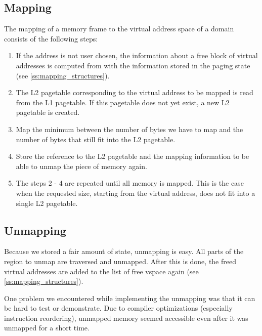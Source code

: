 \subsection{Mapping}

The mapping of a memory frame to the virtual address space of a domain 
consists of the following steps:

\begin{enumerate}
	\item If the address is not user chosen, the information about a free 
    block of virtual addresses is computed from with the information stored in 
    the paging state (see \autoref{ss:mapping_structures}).

	\item The L2 pagetable corresponding to the virtual address to be mapped 
    is read from the L1 pagetable. If this pagetable does not yet exist, a new 
    L2 pagetable is created.

	\item Map the minimum between the number of bytes we have to map and the 
    number of bytes that still fit into the L2 pagetable.

	\item Store the reference to the L2 pagetable and the mapping information 
    to be able to unmap the piece of memory again. 

	\item The steps 2 - 4 are repeated until all memory is mapped. This is the 
    case when the requested size, starting from the virtual address, does not 
    fit into a single L2 pagetable.
\end{enumerate}

\subsection{Unmapping}
Because we stored a fair amount of state, unmapping is easy. All parts of the 
region to unmap are traversed and unmapped. After this is done, the freed 
virtual addresses are added to the list of free vspace again (see 
\autoref{ss:mapping_structures}).
\medskip

One problem we encountered while implementing the unmapping was that it can be 
hard to test or demonstrate. Due to compiler optimizations (especially 
instruction reordering), unmapped memory seemed accessible even after it was 
unmapped for a short time.

